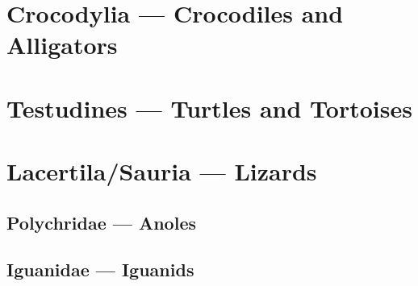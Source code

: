 \documentclass{article}
\begin{document}
\tableofcontents
\pagebreak
\section{Crocodylia --- Crocodiles and Alligators}

\pagebreak

\pagebreak
\section{Testudines --- Turtles and Tortoises}

\pagebreak

\pagebreak

\pagebreak

\pagebreak

\pagebreak

\pagebreak

\pagebreak

\pagebreak

\pagebreak

\pagebreak

\pagebreak

\pagebreak

\pagebreak

\pagebreak

\pagebreak

\pagebreak

\pagebreak
\section{Lacertila/Sauria --- Lizards}

\pagebreak
\subsection{Polychridae --- Anoles}

\pagebreak
\subsection{Iguanidae --- Iguanids}

\pagebreak

\pagebreak

\end{document}
